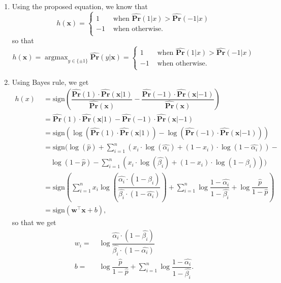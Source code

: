 \documentclass[english]{article}
\DeclareMathOperator*{\argmax}{argmax}
\begin{document}
\begin{enumerate}
  \item Using the proposed equation, we know that
  \[
  h(\mathbf{x}) =\begin{cases}
  1 &\text{ when } \hat{\mathbf{Pr}}(1|x)>\hat{\mathbf{Pr}}(-1|x)\\
  -1 &\text{ when otherwise}.\\
  \end{cases}
\]
so that \[
  h(\mathbf{x}) = \argmax_{y\in\{\pm1\}}\hat{\mathbf{Pr}}(y|\mathbf{x}) = \begin{cases}
  1 &\text{ when } \hat{\mathbf{Pr}}(1|x)>\hat{\mathbf{Pr}}(-1|x)\\
  -1 &\text{ when otherwise}.\\
  \end{cases}
\]

  \item Using Bayes rule, we get\\
  \begin{align*}
  h(x) &\; = \text{sign}(\dfrac{\hat{\mathbf{Pr}}(1)\cdot\hat{\mathbf{Pr}}(\mathbf{x}|1)}{\hat{\mathbf{Pr}}(\mathbf{x})}-\dfrac{\hat{\mathbf{Pr}}(-1)\cdot\hat{\mathbf{Pr}}(\mathbf{x}|-1)}{\hat{\mathbf{Pr}}(\mathbf{x})})\\
  &\; = \hat{\mathbf{Pr}}(1)\cdot\hat{\mathbf{Pr}}(\mathbf{x}|1) - \hat{\mathbf{Pr}}(-1)\cdot\hat{\mathbf{Pr}}(\mathbf{x}|-1)\\
  &\; = \text{sign}(\log(\hat{\mathbf{Pr}}(1)\cdot\hat{\mathbf{Pr}}(\mathbf{x}|1)) - \log(\hat{\mathbf{Pr}}(-1)\cdot\hat{\mathbf{Pr}}(\mathbf{x}|-1)))\\
  &\; = \text{sign}(\log(\hat{p})+\sum\limits_{i=1}^n(x_i\cdot\log(\hat{\alpha_i})+(1-x_i)\cdot\log(1-\hat{\alpha_i}))-\\
  &\;\quad \log(1-\hat{p})-\sum\limits_{i=1}^n(x_i\cdot\log(\hat{\beta_i})+(1-x_i)\cdot\log(1-\beta_i)))\\
  &\;= \text{sign}(\sum\limits_{i=1}^n x_i \log(\dfrac{\hat{\alpha_i}\cdot(1-\hat{\beta_i})}{\hat{\beta_i}\cdot(1-\hat{\alpha_i})})+\sum\limits_{i=1}^n\log\dfrac{1-\hat{\alpha_i}}{1-\hat{\beta_i}}+\log\dfrac{\hat{p}}{1-\hat{p}})\\
  &\; = \text{sign}(\mathbf{w}^\top\mathbf{x}+b),
  \end{align*}
  so that we get\\
  \begin{align*}
  w_i = &\;\boxed{\log\dfrac{\hat{\alpha_i}\cdot(1-\hat{\beta_i})}{\hat{\beta_i}\cdot(1-\hat{\alpha_i})}}\\
  b = &\; \boxed{\log\dfrac{\hat{p}}{1-\hat{p}}+\sum\limits_{i=1}^n\log\dfrac{1-\hat{\alpha_i}}{1-\hat{\beta_i}}}.
  \end{align*}
\end{enumerate}
\clearpage
\end{document}
